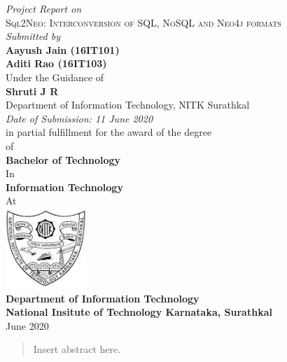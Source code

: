 \documentclass[12pt]{article}
\begin{document}
    \thispagestyle{empty}
    \begin{center}
        \textit{Project Report on}\\
        \vspace{2mm}
        \Large{\textsc{Sql2Neo: Interconversion of SQL, NoSQL and Neo4j formats}}\\
        \vspace{3mm}
        \textit{Submitted by}\\
        \large{\textbf{
            Aayush Jain (16IT101)\\
            Aditi Rao (16IT103)
        }}\\
        \vspace{4mm}
        Under the Guidance of\\
        \textbf{Shruti J R}\\
        Department of Information Technology, NITK Surathkal\\
        \vspace{4mm}
        \textit{Date of Submission: 11 June 2020}\\
        \vspace{4mm}
        in partial fulfillment for the award of the degree\\
        of\\
        \textbf{Bachelor of Technology}\\
        In\\
        \textbf{Information Technology}\\
        At
        \vspace{4mm}\\
        \includegraphics[width=1.2in,height=1.2in]{img/nitk.jpg}\\
        \textbf{Department of Information Technology}\\
        \textbf{National Insitute of Technology Karnataka, Surathkal}\\
        June 2020
    \end{center}

    \newpage

    \begin{abstract}
        Insert abstract here.
    \end{abstract}
\end{document}
